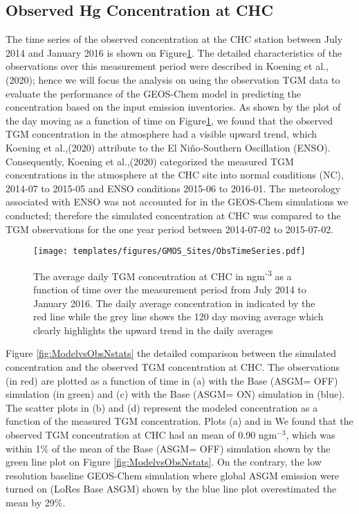 \subsection{Observed Hg Concentration at CHC}
\begin{flushleft}
The time series of the observed concentration at the CHC station between July 2014 and January 2016 is shown on Figure\ref{fig:ObsTseries}. The detailed characteristics of the observations over this measurement period were described in Koening et al.,(2020); hence we will focus the analysis on using the observation TGM data to evaluate the performance of the GEOS-Chem model in predicting the \hg concentration based on the input \hg emission inventories. As shown by the plot of the  day moving as a function of time on Figure\ref{fig:ObsTseries}, we found that the observed TGM concentration in the atmosphere had a visible upward trend, which Koening et al.,(2020) attribute to the El Niño-Southern Oscillation (ENSO). Consequently, Koening et al.,(2020) categorized the measured TGM concentrations in the atmosphere at the CHC site into normal conditions (NC), 2014-07 to 2015-05 and ENSO conditions  2015-06 to 2016-01. The meteorology associated with ENSO was not accounted for in the GEOS-Chem \hg simulations we conducted; therefore the simulated \hg concentration at CHC was compared to the TGM observations for the one year period between 2014-07-02 to 2015-07-02.
\end{flushleft}

\begin{figure}[H]
  \texttt{[image: templates/figures/GMOS\_Sites/ObsTimeSeries.pdf]}
 
  \caption{The average daily TGM concentration at CHC in ngm\textsuperscript{-3} as a function of time over the measurement period from July 2014 to January 2016. The daily average concentration in indicated by the red line while the grey line shows the 120 day moving average which clearly highlights the upward trend in the daily averages}
  \label{fig:ObsTseries}
  \centering
\end{figure}
\FloatBarrier

\begin{flushleft}
  Figure \ref{fig:ModelvsObsNstats} the detailed comparison between the simulated \hg concentration and the observed TGM concentration at CHC. The observations (in red) are plotted as a function of time in (a) with the Base (ASGM= OFF) simulation (in green) and (c) with the Base (ASGM= ON) simulation in (blue). The scatter plots in (b) and (d) represent the modeled \hg concentration as a function of the measured TGM concentration. Plots (a) and   in We found that the observed TGM concentration at CHC had an mean of 0.90 ngm$^{-3}$, which was within 1\% of the mean of the Base (ASGM= OFF) simulation shown by the green line plot on Figure \ref{fig:ModelvsObsNstats}. On the contrary, the low resolution baseline GEOS-Chem simulation where global ASGM emission were turned on (LoRes Base ASGM) shown by the blue line plot overestimated the mean by 29\%.
\end{flushleft}


